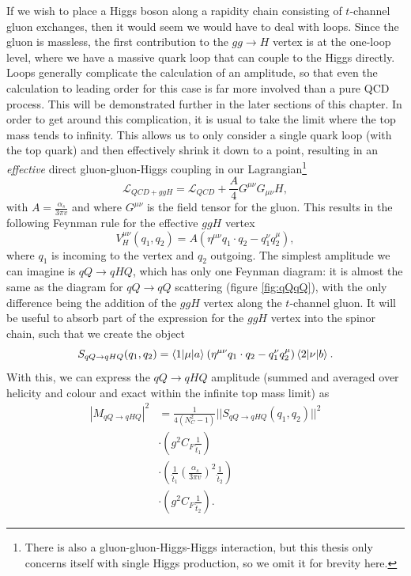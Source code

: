 If we wish to place a Higgs boson along a rapidity chain consisting of $t$-channel gluon exchanges, then it would seem we would have to deal with loops. Since the gluon is massless, the first contribution to the $gg \to H$ vertex is at the one-loop level, where we have a massive quark loop that can couple to the Higgs directly. Loops generally complicate the calculation of an amplitude, so that even the calculation to leading order for this case is far more involved than a pure QCD process. This will be demonstrated further in the later sections of this chapter. In order to get around this complication, it is usual to take the limit where the top mass tends to infinity. This allows us to only consider a single quark loop (with the top quark) and then effectively shrink it down to a point, resulting in an \emph{effective} direct gluon-gluon-Higgs coupling in our Lagrangian\footnote{There is also a gluon-gluon-Higgs-Higgs interaction, but this thesis only concerns itself with single Higgs production, so we omit it for brevity here.} 
\begin{equation}
\mathscr{L}_{QCD + ggH} = \mathscr{L}_{QCD} + \frac{A}{4} G^{\mu \nu}G_{\mu \nu}H,
\end{equation}
with $A = \frac{\alpha_s}{3 \pi v}$ \cite{Duca2003} and where $G^{\mu \nu}$ is the field tensor for the gluon. This results in the following Feynman rule for the effective $ggH$ vertex \cite{Andersen2009a}
\begin{equation}
V_H^{\mu \nu}(q_1, q_2) = A \left( \eta^{\mu \nu} q_1 \cdot q_2 - q_1^\nu q_2^\mu \right),
\end{equation}
where $q_1$ is incoming to the vertex and $q_2$ outgoing. The simplest amplitude we can imagine is $qQ \to qHQ$, which has only one Feynman diagram: it is almost the same as the diagram for $qQ \to qQ$ scattering (figure \ref{fig:qQqQ}), with the only difference being the addition of the $ggH$ vertex along the $t$-channel gluon. It will be useful to absorb part of the expression for the $ggH$ vertex into the spinor chain, such that we create the object
\begin{equation}
S_{qQ \to qHQ}(q_1, q_2) = \mathinner{\langle1\vert\mu\vert a\rangle}_{} (\eta^{\mu \nu}q_1 \cdot q_2 - q_1^\nu q_2^\mu)\mathinner{\langle2\vert\nu\vert b\rangle}_{}. 
\end{equation} %
With this, we can express the $qQ \to qHQ$ amplitude (summed and averaged over helicity and colour and exact within the infinite top mass limit) as
\begin{equation}
\begin{split}
|M_{qQ \to qHQ}|^2 &= \frac{1}{4(N_C^2 - 1)} ||S_{qQ \to qHQ}(q_1, q_2)||^2 \\
& \cdot \left(g^2 C_F \frac{1}{\hat{t}_1} \right) \\
& \cdot \left(\frac{1}{\hat{t}_1} \left(\frac{\alpha_s}{3 \pi v} \right)^2 \frac{1}{\hat{t}_2} \right) \\
& \cdot \left(g^2 C_F \frac{1}{\hat{t}_2} \right).
\end{split}
\end{equation}
